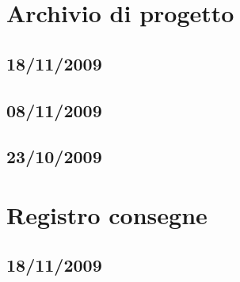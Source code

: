 \documentclass[a4paper, 12pt]{report}
\begin{document}
\tableofcontents

\newpage



\chapter{Archivio di progetto}

\section{18/11/2009}

















 
\section{08/11/2009}





\section{23/10/2009}




\chapter{Registro consegne}

\section{18/11/2009}



\end{document}

